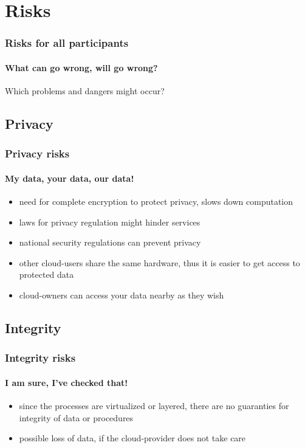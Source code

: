 \documentclass[]{beamer}
\begin{document}
\section{Risks}

\begin{frame}
        \frametitle{Risks for all participants}
        \framesubtitle{What can go wrong, will go wrong?}
       \begin{center}
        Which problems and dangers might occur?
       \end{center}
\end{frame}

\subsection{Privacy}

\begin{frame}
        \frametitle{Privacy risks}
        \framesubtitle{My data, your data, our data!}
        \begin{itemize}
                \item need for complete encryption to protect privacy, slows
                down computation
                \item laws for privacy regulation might hinder services
                \item national security regulations can prevent privacy
                \item other cloud-users share the same hardware, thus it is
                easier to get access to protected data
                \item cloud-owners can access your data nearby as they wish
        \end{itemize}
\end{frame}

\subsection{Integrity}

\begin{frame}
        \frametitle{Integrity risks}
        \framesubtitle{I am sure, I've checked that!}
        \begin{itemize}
                \item since the processes are virtualized or layered, there are
                no guaranties for integrity of data or procedures
                \item possible loss of data, if the cloud-provider does not take
                care
        \end{itemize}
\end{frame}
\end{document}
